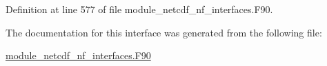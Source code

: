Definition at line 577 of file module\+\_\+netcdf\+\_\+nf\+\_\+interfaces.\+F90.



The documentation for this interface was generated from the following file\+:\begin{DoxyCompactItemize}
\item 
\hyperlink{module__netcdf__nf__interfaces_8F90}{module\+\_\+netcdf\+\_\+nf\+\_\+interfaces.\+F90}\end{DoxyCompactItemize}
